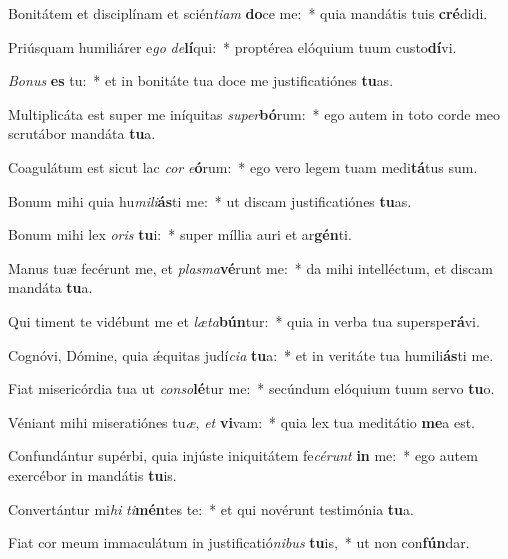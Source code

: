 \item Bonitátem et disciplínam et scién\textit{ti}\textit{am} \textbf{do}ce me:~* quia mandátis tuis \textbf{cré}didi.
\item Priúsquam humiliárer e\textit{go} \textit{de}\textbf{lí}qui:~* proptérea elóquium tuum custo\textbf{dí}vi.
\item \textit{Bo}\textit{nus} \textbf{es} tu:~* et in bonitáte tua doce me justificatiónes \textbf{tu}as.
\item Multiplicáta est super me iníquitas \textit{su}\textit{per}\textbf{bó}rum:~* ego autem in toto corde meo scrutábor mandáta \textbf{tu}a.
\item Coagulátum est sicut lac \textit{cor} \textit{e}\textbf{ó}rum:~* ego vero legem tuam medi\textbf{tá}tus sum.
\item Bonum mihi quia hu\textit{mi}\textit{li}\textbf{ás}ti me:~* ut discam justificatiónes \textbf{tu}as.
\item Bonum mihi lex \textit{o}\textit{ris} \textbf{tu}i:~* super míllia auri et ar\textbf{gén}ti.
\item Manus tuæ fecérunt me, et \textit{plas}\textit{ma}\textbf{vé}runt me:~* da mihi intelléctum, et discam mandáta \textbf{tu}a.
\item Qui timent te vidébunt me et \textit{læ}\textit{ta}\textbf{bún}tur:~* quia in verba tua superspe\textbf{rá}vi.
\item Cognóvi, Dómine, quia ǽquitas judí\textit{ci}\textit{a} \textbf{tu}a:~* et in veritáte tua humili\textbf{ás}ti me.
\item Fiat misericórdia tua ut \textit{con}\textit{so}\textbf{lé}tur me:~* secúndum elóquium tuum servo \textbf{tu}o.
\item Véniant mihi miseratiónes tu\textit{æ}, \textit{et} \textbf{vi}vam:~* quia lex tua meditátio \textbf{me}a est.
\item Confundántur supérbi, quia injúste iniquitátem fe\textit{cé}\textit{runt} \textbf{in} me:~* ego autem exercébor in mandátis \textbf{tu}is.
\item Convertántur mi\textit{hi} \textit{ti}\textbf{mén}tes te:~* et qui novérunt testimónia \textbf{tu}a.
\item Fiat cor meum immaculátum in justificatió\textit{ni}\textit{bus} \textbf{tu}is,~* ut non con\textbf{fún}dar.
